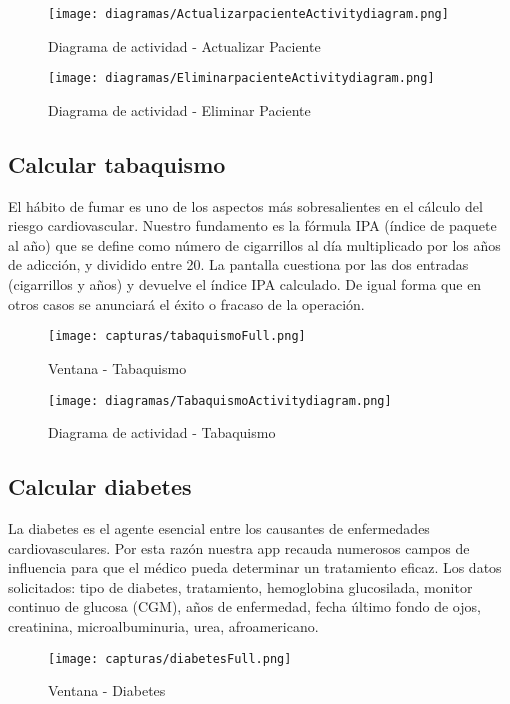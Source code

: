 \documentclass[11pt,spanish,
		listoftables,listoffigures]
		{tfgplantilla}
\begin{document}
\begin{figure}[H]
\centering
\texttt{[image: diagramas/ActualizarpacienteActivitydiagram.png]}
\caption{Diagrama de actividad - Actualizar Paciente}
\end{figure}

\begin{figure}[H]
\centering
\texttt{[image: diagramas/EliminarpacienteActivitydiagram.png]}
\caption{Diagrama de actividad - Eliminar Paciente}
\end{figure}

\subsection {Calcular tabaquismo}

El hábito de fumar es uno de los aspectos más sobresalientes en el cálculo del riesgo cardiovascular. Nuestro fundamento es la fórmula  IPA (índice de paquete al año) que se define como número de cigarrillos al día multiplicado por los años de adicción, y dividido entre 20. La pantalla cuestiona por las dos entradas (cigarrillos y años) y devuelve el índice IPA calculado. De igual forma que en otros casos se anunciará el éxito o fracaso de la operación.

\begin{figure}[H]
\centering
\texttt{[image: capturas/tabaquismoFull.png]}
\caption{Ventana - Tabaquismo}
\end{figure}

\begin{figure}[H]
\centering
\texttt{[image: diagramas/TabaquismoActivitydiagram.png]}
\caption{Diagrama de actividad - Tabaquismo}
\end{figure}

\subsection {Calcular diabetes}

La diabetes es el agente esencial entre los causantes de enfermedades cardiovasculares. Por esta razón nuestra app recauda numerosos campos de influencia para que el médico pueda determinar un tratamiento eficaz. Los datos solicitados: tipo de diabetes, tratamiento, hemoglobina glucosilada, monitor continuo de glucosa (CGM), años de enfermedad, fecha último fondo de ojos, creatinina, microalbuminuria, urea, afroamericano.

\begin{figure}[H]
\centering
\texttt{[image: capturas/diabetesFull.png]}
\caption{Ventana - Diabetes}
\end{figure}
\end{document}
